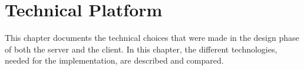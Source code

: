 \chapter{Technical Platform}\label{cha:technicalPlatform}

This chapter documents the technical choices that were made in the
design phase of both the server and the client. In this chapter, the
different technologies, needed for the implementation, are described
and compared.







